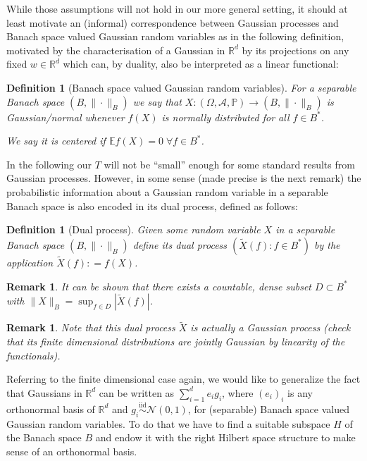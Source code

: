 \documentclass[11pt,reqno]{amsart}
\numberwithin{equation}{section}
\newtheorem{defi}[thm]{Definition}
\newtheorem{rem}[thm]{Remark}
\newcommand{\deq}{\mathrel{\mathop:}=}
\newcommand{\iidnormal}{\mathrel{\stackrel{\text{iid}}{\sim}}\mathcal N(0,1)}
\begin{document}
While those assumptions will not hold in our more general setting, it should at least motivate an (informal) correspondence between Gaussian processes and Banach space valued Gaussian random variables as in the following definition, motivated by the characterisation of a Gaussian in $\mathbb R^d$ by its projections on any fixed $w\in\mathbb R^d$ which can, by duality, also be interpreted as a linear functional:

\begin{defi}[Banach space valued Gaussian random variables]
	For a separable Banach space $(B,\|\cdot\|_B)$ we say that $X:(\Omega,\mathcal A,\mathbb P)\rightarrow(B,\|\cdot\|_B)$ is Gaussian/normal whenever $f(X)$ is normally distributed for all $f\in B^*$.
	
	We say it is centered if $\mathbb E f(X)=0\; \forall f\in B^*$.
\end{defi}

In the following our $T$ will not be ``small'' enough for some standard results from Gaussian processes. However, in some sense (made precise is the next remark) the probabilistic information about a Gaussian random variable in a separable Banach space is also encoded in its dual process, defined as follows:

\begin{defi}[Dual process]
	Given some random variable $X$ in a separable Banach space $(B,\|\cdot\|_B)$ define its dual process $(\tilde X(f): f\in B^*)$ by the application $\tilde X(f)\deq f(X)$.
\end{defi}

\begin{rem}
	It can be shown that there exists a countable, dense subset $D\subset B^*$ with $\|X\|_B = \sup_{f\in D}|\tilde X(f)|$.
\end{rem}

\begin{rem}
	Note that this dual process $\tilde X$ is actually a Gaussian process (check that its finite dimensional distributions are \emph{jointly} Gaussian by linearity of the functionals).
\end{rem}

Referring to the finite dimensional case again, we would like to generalize the fact that Gaussians in $\mathbb R^d$ can be written as $\sum_{i=1}^d e_ig_i$, where $(e_i)_i$ is any orthonormal basis of $\mathbb R^d$ and $g_i\iidnormal$, for (separable) Banach space valued Gaussian random variables. To do that we have to find a suitable subspace $H$ of the Banach space $B$ and endow it with the right Hilbert space structure to make sense of an orthonormal basis.
\end{document}
